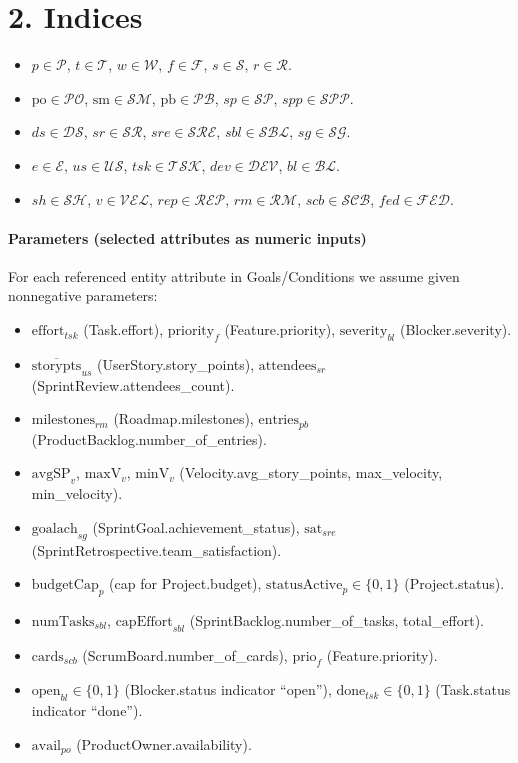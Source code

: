\documentclass[11pt,a4paper]{article}
\begin{document}
\section{2. Indices}
\begin{itemize}
  \item $p\in\mathcal{P}$, $t\in\mathcal{T}$, $w\in\mathcal{W}$, $f\in\mathcal{F}$, $s\in\mathcal{S}$, $r\in\mathcal{R}$.
  \item $\text{po}\in\mathcal{PO}$, $\text{sm}\in\mathcal{SM}$, $\text{pb}\in\mathcal{PB}$, $sp\in\mathcal{SP}$, $spp\in\mathcal{SPP}$.
  \item $ds\in\mathcal{DS}$, $sr\in\mathcal{SR}$, $sre\in\mathcal{SRE}$, $sbl\in\mathcal{SBL}$, $sg\in\mathcal{SG}$.
  \item $e\in\mathcal{E}$, $us\in\mathcal{US}$, $tsk\in\mathcal{TSK}$, $dev\in\mathcal{DEV}$, $bl\in\mathcal{BL}$.
  \item $sh\in\mathcal{SH}$, $v\in\mathcal{VEL}$, $rep\in\mathcal{REP}$, $rm\in\mathcal{RM}$, $scb\in\mathcal{SCB}$, $fed\in\mathcal{FED}$.
\end{itemize}

\paragraph{Parameters (selected attributes as numeric inputs)}
For each referenced entity attribute in Goals/Conditions we assume given nonnegative parameters:
\begin{itemize}
  \item $\text{effort}_{tsk}$ (Task.effort), $\text{priority}_{f}$ (Feature.priority), $\text{severity}_{bl}$ (Blocker.severity).
  \item $\overline{\text{storypts}}_{us}$ (UserStory.story\_points), $\text{attendees}_{sr}$ (SprintReview.attendees\_count).
  \item $\text{milestones}_{rm}$ (Roadmap.milestones), $\text{entries}_{pb}$ (ProductBacklog.number\_of\_entries).
  \item $\text{avgSP}_{v}$, $\text{maxV}_{v}$, $\text{minV}_{v}$ (Velocity.avg\_story\_points, max\_velocity, min\_velocity).
  \item $\text{goalach}_{sg}$ (SprintGoal.achievement\_status), $\text{sat}_{sre}$ (SprintRetrospective.team\_satisfaction).
  \item $\text{budgetCap}_{p}$ (cap for Project.budget), $\text{statusActive}_{p}\in\{0,1\}$ (Project.status).
  \item $\text{numTasks}_{sbl}$, $\text{capEffort}_{sbl}$ (SprintBacklog.number\_of\_tasks, total\_effort).
  \item $\text{cards}_{scb}$ (ScrumBoard.number\_of\_cards), $\text{prio}_{f}$ (Feature.priority).
  \item $\text{open}_{bl}\in\{0,1\}$ (Blocker.status indicator ``open''), $\text{done}_{tsk}\in\{0,1\}$ (Task.status indicator ``done'').
  \item $\text{avail}_{po}$ (ProductOwner.availability).
\end{itemize}
\end{document}

